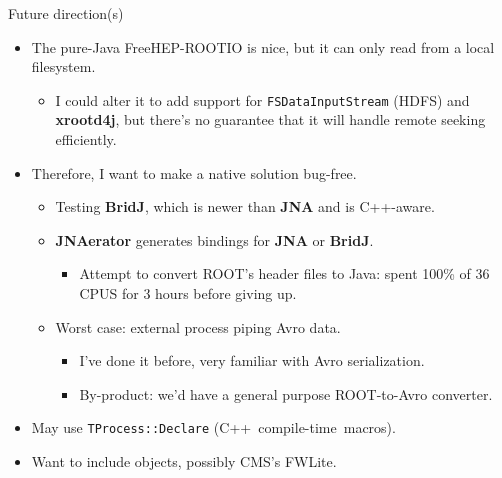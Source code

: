 \documentclass{beamer}
\begin{document}
\begin{frame}{Future direction(s)}
\begin{itemize}
\item The pure-Java FreeHEP-ROOTIO is nice, but it can only read from a local filesystem.
\begin{itemize}
\item I could alter it to add support for {\tt FSDataInputStream} (HDFS) and {\bf xrootd4j}, but there's no guarantee that it will handle remote seeking efficiently.
\end{itemize}

\item Therefore, I want to make a native solution bug-free.
\begin{itemize}
\item Testing {\bf BridJ}, which is newer than {\bf JNA} and is C++-aware.
\item {\bf JNAerator} generates bindings for {\bf JNA} or {\bf BridJ}.
\begin{itemize}
\item Attempt to convert ROOT's header files to Java: spent 100\% of 36 CPUS for 3 hours before giving up.
\end{itemize}
\item Worst case: external process piping Avro data.
\begin{itemize}
\item I've done it before, very familiar with Avro serialization.
\item By-product: we'd have a general purpose ROOT-to-Avro converter.
\end{itemize}
\end{itemize}

\item May use {\tt TProcess::Declare} \mbox{(C++ compile-time macros).\hspace{-1 cm}}

\item Want to include objects, possibly CMS's FWLite.
\end{itemize}
\end{frame}
\end{document}
